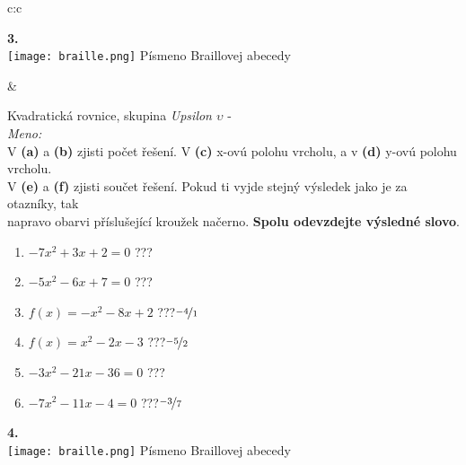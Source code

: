 \documentclass[10pt]{report}
\begin{document}
\begin{tabular}{c:c}
\begin{minipage}[c][99mm][t]{0.49\linewidth}
\begin{center}
\begin{minipage}{0.20\linewidth}
\begin{center}
{\Huge\bfseries 3.} \\[2mm]
\texttt{[image: braille.png]}
{\small Písmeno Braillovej abecedy}
\end{center}
\end{minipage}
\end{center}
\end{minipage}
&
\begin{minipage}[c][99mm][t]{0.49\linewidth}
\begin{center}
\vspace{7mm}
{\huge Kvadratická rovnice, skupina \textit{Upsilon $\upsilon$} -}\\[4.5mm]
\textit{Meno:}\phantom{xxxxxxxxxxxxxxxxxxxxxxxxxxxxxxxxxxxxxxxxxxxxxxxxxxxxxxxxxxxxxxxxx}\\[3.5mm]
V \textbf{(a)} a \textbf{(b)} zjisti počet řešení. V \textbf{(c)} x-ovú polohu vrcholu, a v \textbf{(d)} y-ovú polohu vrcholu.\\V \textbf{(e)} a \textbf{(f)} zjisti součet řešení. Pokud ti vyjde stejný výsledek jako je za otazníky, tak\\napravo obarvi příslušející kroužek načerno. \textbf{Spolu odevzdejte výsledné slovo}.\\[3mm]
\begin{minipage}{0.77\linewidth}
\begin{center}
\begin{varwidth}{\textwidth}
\begin{enumerate}
\large
\item $-7x^2+3x+2=0$\quad \dotfill\; ???\;\dotfill {}
\item $-5x^2-6x+7=0$\quad \dotfill\; ???\;\dotfill {}
\item $f(x)=-x^2-8x+2$\quad \dotfill\; ???\;\dotfill \quad $\nicefrac{-4}{1}$
\item $f(x)=x^2-2x-3$\quad \dotfill\; ???\;\dotfill \quad $\nicefrac{-5}{2}$
\item $-3x^2-21x-36=0$\quad \dotfill\; ???\;\dotfill {}
\item $-7x^2-11x-4=0$\quad \dotfill\; ???\;\dotfill \quad $\nicefrac{-3}{7}$
\end{enumerate}
\end{varwidth}
\end{center}
\end{minipage}
\begin{minipage}{0.20\linewidth}
\begin{center}
{\Huge\bfseries 4.} \\[2mm]
\texttt{[image: braille.png]}
{\small Písmeno Braillovej abecedy}
\end{center}
\end{minipage}
\end{center}
\end{minipage}

\end{tabular}
\end{document}
